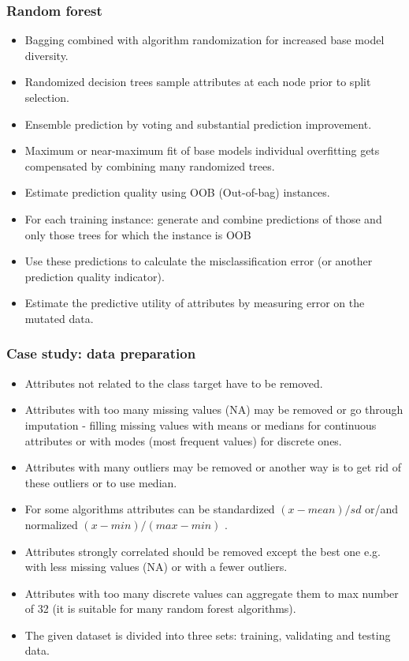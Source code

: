 \documentclass[proffesionalfonts]{beamer}
\begin{document}
\begin{frame}
\small
\frametitle{Random forest}
\begin{block}{}
\begin{itemize}
\item Bagging combined with algorithm randomization for increased base model diversity.
\item Randomized decision trees sample attributes at each node prior to split selection.
\item Ensemble prediction by voting and substantial prediction improvement.
\item Maximum or near-maximum fit of base models individual overfitting gets compensated by combining many randomized trees.
\item Estimate prediction quality using OOB (Out-of-bag) instances.
\item For each training instance: generate and combine predictions of those and only those trees for which the instance is OOB
\item Use these predictions to calculate the misclassification error (or another prediction quality indicator).
\item Estimate the predictive utility of attributes by measuring error on the mutated data.
\end{itemize}
\end{block}
\end{frame}

\begin{frame}
\small
\frametitle{Case study: data preparation}
\begin{block}{}
\begin{itemize}
\item Attributes not related to the class target have to be removed.
\item Attributes with too many missing values (NA) may be removed or go through imputation - filling missing values with means or medians for continuous attributes or with modes (most frequent values) for discrete ones.
\item Attributes with many outliers may be removed or another way is to get rid of these outliers or to use median.
\item For some algorithms attributes can be standardized $(x-mean)/sd$ or/and normalized $(x - min)/(max -min)$ .
\item Attributes strongly correlated should be removed except the best one e.g. with less missing values (NA) or with a fewer outliers.
\item Attributes with too many discrete values can aggregate them to max number of 32 (it is suitable for many random forest algorithms).
\item The given dataset is divided into three sets: training, validating and testing data. 
\end{itemize}
\end{block}
\end{frame}
\end{document}
